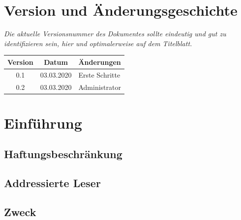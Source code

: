 \documentclass[enabledeprecatedfontcommands,fontsize=12pt,paper=a4,twoside]{scrartcl}
\begin{document}


\newpage

  \thispagestyle{fancy}
  \fancyhead{}
  \fancyfoot{}
  \renewcommand{\headrulewidth}{0.4pt}
  \tableofcontents

\newpage





\section*{Version und Änderungsgeschichte}

{\em Die aktuelle Versionsnummer des Dokumentes sollte eindeutig und gut zu
identifizieren sein, hier und optimalerweise auf dem Titelblatt.}

\begin{tabular}{ccl}
Version & Datum & Änderungen \\
\hline
0.1 & 03.03.2020 & Erste Schritte \\
0.2 & 03.03.2020 & Administrator \\
\end{tabular}



\newpage
\section{Einführung}
\subsection{Haftungsbeschränkung}
\subsection{Addressierte Leser}
\subsection{Zweck}
\end{document}
